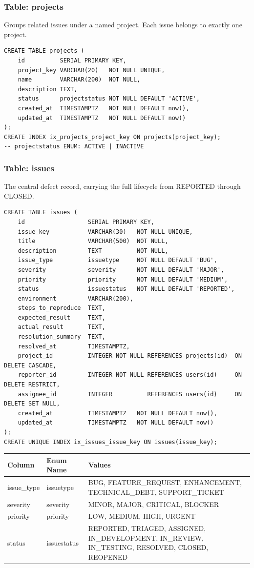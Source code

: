 \documentclass[11pt]{article}
\newcommand{\tblhead}[1]{\rowcolor{accent}\color{white}\bfseries #1}
\begin{document}
\subsubsection{Table: projects}
Groups related issues under a named project. Each issue belongs to exactly one project.

\begin{lstlisting}
CREATE TABLE projects (
    id          SERIAL PRIMARY KEY,
    project_key VARCHAR(20)   NOT NULL UNIQUE,
    name        VARCHAR(200)  NOT NULL,
    description TEXT,
    status      projectstatus NOT NULL DEFAULT 'ACTIVE',
    created_at  TIMESTAMPTZ   NOT NULL DEFAULT now(),
    updated_at  TIMESTAMPTZ   NOT NULL DEFAULT now()
);
CREATE INDEX ix_projects_project_key ON projects(project_key);
-- projectstatus ENUM: ACTIVE | INACTIVE
\end{lstlisting}

\subsubsection{Table: issues}
The central defect record, carrying the full lifecycle from REPORTED through CLOSED.

\begin{lstlisting}
CREATE TABLE issues (
    id                  SERIAL PRIMARY KEY,
    issue_key           VARCHAR(30)   NOT NULL UNIQUE,
    title               VARCHAR(500)  NOT NULL,
    description         TEXT          NOT NULL,
    issue_type          issuetype     NOT NULL DEFAULT 'BUG',
    severity            severity      NOT NULL DEFAULT 'MAJOR',
    priority            priority      NOT NULL DEFAULT 'MEDIUM',
    status              issuestatus   NOT NULL DEFAULT 'REPORTED',
    environment         VARCHAR(200),
    steps_to_reproduce  TEXT,
    expected_result     TEXT,
    actual_result       TEXT,
    resolution_summary  TEXT,
    resolved_at         TIMESTAMPTZ,
    project_id          INTEGER NOT NULL REFERENCES projects(id)  ON DELETE CASCADE,
    reporter_id         INTEGER NOT NULL REFERENCES users(id)     ON DELETE RESTRICT,
    assignee_id         INTEGER          REFERENCES users(id)     ON DELETE SET NULL,
    created_at          TIMESTAMPTZ   NOT NULL DEFAULT now(),
    updated_at          TIMESTAMPTZ   NOT NULL DEFAULT now()
);
CREATE UNIQUE INDEX ix_issues_issue_key ON issues(issue_key);
\end{lstlisting}

\renewcommand{\arraystretch}{1.25}
\begin{tabular}{|L{2.6cm}|L{2.6cm}|L{10.6cm}|}
\hline
\tblhead{Column} & \tblhead{Enum Name} & \tblhead{Values} \\
\hline
issue\_type & issuetype & BUG, FEATURE\_REQUEST, ENHANCEMENT, TECHNICAL\_DEBT, SUPPORT\_TICKET \\
\hline
severity & severity & MINOR, MAJOR, CRITICAL, BLOCKER \\
\hline
priority & priority & LOW, MEDIUM, HIGH, URGENT \\
\hline
status & issuestatus & REPORTED, TRIAGED, ASSIGNED, IN\_DEVELOPMENT, IN\_REVIEW, IN\_TESTING, RESOLVED, CLOSED, REOPENED \\
\hline
\end{tabular}
\endrowcolors
\end{document}
